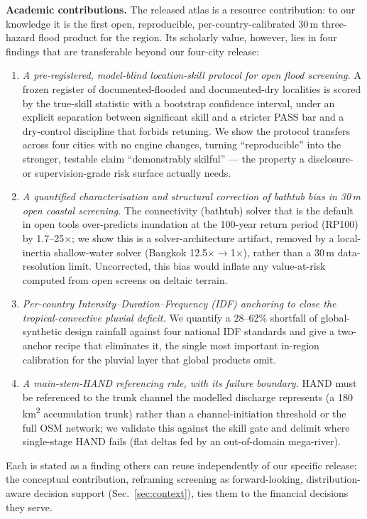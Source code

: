 \documentclass[11pt,a4paper]{article}
\begin{document}
\textbf{Academic contributions.} The released atlas is a resource contribution: to our knowledge it is the first open, reproducible, per-country-calibrated 30\,m three-hazard flood product for the region. Its scholarly value, however, lies in four findings that are transferable beyond our four-city release:
\begin{enumerate}[leftmargin=*,itemsep=2pt,topsep=3pt]
\item \emph{A pre-registered, model-blind location-skill protocol for open flood screening.} A frozen register of documented-flooded and documented-dry localities is scored by the true-skill statistic with a bootstrap confidence interval, under an explicit separation between significant skill and a stricter PASS bar and a dry-control discipline that forbids retuning. We show the protocol transfers across four cities with no engine changes, turning ``reproducible'' into the stronger, testable claim ``demonstrably skilful'' --- the property a disclosure- or supervision-grade risk surface actually needs.
\item \emph{A quantified characterisation and structural correction of bathtub bias in 30\,m open coastal screening.} The connectivity (bathtub) solver that is the default in open tools over-predicts inundation at the 100-year return period (RP100) by 1.7--25$\times$; we show this is a solver-architecture artifact, removed by a local-inertia shallow-water solver (Bangkok 12.5$\times{\rightarrow}$1$\times$), rather than a 30\,m data-resolution limit. Uncorrected, this bias would inflate any value-at-risk computed from open screens on deltaic terrain.
\item \emph{Per-country Intensity--Duration--Frequency (IDF) anchoring to close the tropical-convective pluvial deficit.} We quantify a 28--62\% shortfall of global-synthetic design rainfall against four national IDF standards and give a two-anchor recipe that eliminates it, the single most important in-region calibration for the pluvial layer that global products omit.
\item \emph{A main-stem-HAND referencing rule, with its failure boundary.} HAND must be referenced to the trunk channel the modelled discharge represents (a 180\,km\textsuperscript{2} accumulation trunk) rather than a channel-initiation threshold or the full OSM network; we validate this against the skill gate and delimit where single-stage HAND fails (flat deltas fed by an out-of-domain mega-river).
\end{enumerate}
Each is stated as a finding others can reuse independently of our specific release; the conceptual contribution, reframing screening as forward-looking, distribution-aware decision support (Sec.~\ref{sec:context}), ties them to the financial decisions they serve.
\end{document}
